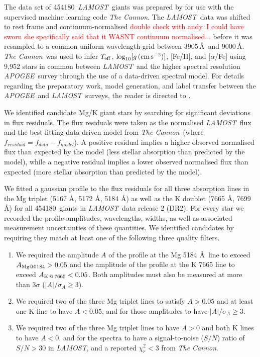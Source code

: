 \documentclass[a4paper,fleqn,usenatbib]{mnras}
\newcommand{\todo}[1]{\textcolor{red}{#1}}
\newcommand{\LamostGiants}{454180}
\newcommand{\project}[1]{\emph{#1}}
\newcommand{\lamost}{\project{LAMOST}}
\newcommand{\apogee}{\project{APOGEE}}
\newcommand{\tc}{\project{The Cannon}}
\newcommand{\teff}{T_{\rm eff}}
\newcommand{\logg}{\log_{10}[g\,({\rm cm\,s}^{-2})]}
\begin{document}
The data set of \LamostGiants\ \lamost\ giants was prepared by \citet{ho2017} for use with the supervised machine learning code \tc. The \lamost\ data was shifted to rest frame and continuum-normalised \todo{double check with andy. I could have sworn she specifically said that it WASNT continuum normalised...} before it was resampled to a common uniform wavelength grid between 3905\,\AA\ and 9000\,\AA. \tc\ was used to infer $\teff$, $\logg$, [Fe/H], and [$\alpha$/Fe] using 9,952 stars in common between \lamost\ and the higher spectral resolution \apogee\ survey through the use of a data-driven spectral model. For details regarding the preparatory work, model generation, and label transfer between the \apogee\ and \lamost\ surveys, the reader is directed to \citet{ho2017}. 

We identified candidate Mg/K giant stars by searching for significant deviations in flux residuals. The flux residuals were taken as the normalised \lamost\ flux and the best-fitting data-driven model from \tc\ (where $f_{residual} = f_{data} - f_{model}$). A positive residual implies a higher observed normalised flux than expected by the model (less stellar absorption than predicted by the model), while a negative residual implies a lower observed normalised flux than expected (more stellar absorption than predicted by the model). 

We fitted a gaussian profile to the flux residuals for all three absorption lines in the Mg triplet (5167 \AA, 5172 \AA, 5184 \AA) as well as the K doublet (7665 \AA, 7699 \AA) for all \LamostGiants\ giants in \lamost\ data release 2 (DR2). For every star we recorded the profile amplitudes, wavelengths, widths, as well as associated measurement uncertainties of these quantities. We identified candidates by requiring they match at least one of the following three quality filters.
\begin{enumerate}
\item We required the amplitude $A$ of the profile at the Mg 5184 \AA \ line to exceed $A_{{\rm Mg} @ 5184} > 0.05$ and the amplitude of the profile at the K 7665 line to exceed $A_{{\rm K}\,@\,7665} < 0.05$. Both amplitudes must also be measured at more than $3\sigma$ ($|A|/\sigma_{A} \geq 3$).
\item We required two of the three Mg triplet lines to satisfy $A > 0.05$ and at least one K line to have $A < 0.05$, and for those amplitudes to have $|A|/\sigma_{A} \geq 3$.
\item We required two of the three Mg triplet lines to have $A > 0$ and both K lines to have $A < 0$, and for the spectra to have a signal-to-noise ($S/N$) ratio of $S/N > 30$ in \lamost, and a reported $\chi_{r}^2 < 3$ from \tc.
\end{enumerate} 
 
\end{document}
